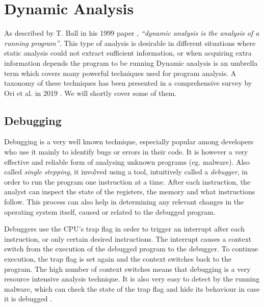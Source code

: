 \section{Dynamic Analysis}

As described by T. Ball in his 1999 paper \cite{concept_of_da_1999}, \emph{``dynamic analysis is the analysis of a running program''}. This type of analysis is desirable in different situations where static analysis could not extract sufficient information, or when acquiring extra information depends the program to be running %
Dynamic analysis is an umbrella term which covers many powerful techniques used for program analysis. A taxonomy of these techniques has been presented in a comprehensive survey by Ori et al. in 2019 \cite{da_survey_2019}. We will shortly cover some of them.

\subsection{Debugging}


Debugging is a very well known technique, especially popular among developers who use it mainly to identify bugs or errors in their code. It is however a very effective and reliable form of analysing unknown programs (eg. malware). Also called \emph{single stepping}, it involved using a tool, intuitively called a \emph{debugger}, in order to run the program one instruction at a time. After each instruction, the analyst can inspect the state of the registers, the memory and what instructions follow. This process can also help in determining any relevant changes in the operating system itself, caused or related to the debugged program.

Debuggers use the CPU's trap flag in order to trigger an interrupt after each instruction, or only certain desired instructions. The interrupt causes a context switch from the execution of the debugged program to the debugger. To continue execution, the trap flag is set again and the context switches back to the program. The high number of context switches means that debugging is a very resource intensive analysis technique. It is also very easy to detect by the running malware, which can check the state of the trap flag and hide its behaviour in case it is debugged \cite{da_survey_2019}.


